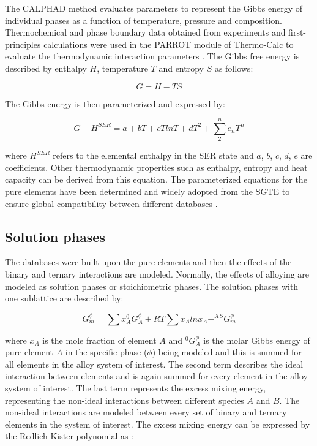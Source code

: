 The CALPHAD method evaluates parameters to represent the Gibbs energy of individual phases as a function of temperature, pressure and composition. Thermochemical and phase boundary data obtained from experiments and first-principles calculations were used in the PARROT module of Thermo-Calc to evaluate the thermodynamic interaction parameters \cite{Andersson2002}. The Gibbs free energy is described by enthalpy $H$, temperature $T$ and entropy $S$ as follows:

\begin{equation}
\label{eq: gibbs}
G = H - T S 
\end{equation}

\noindent The Gibbs energy is then parameterized and expressed by:

\begin{equation}
\label{eq: parameterizaiton}
G - H^{SER} = a + bT + cT ln T + d T^2 + \sum_{2}^{n} e_{n} T^{n}
\end{equation}

\noindent where $H^{SER}$ refers to the elemental enthalpy in the SER state and $a$, $b$, $c$, $d$, $e$ are coefficients. Other thermodynamic properties such as enthalpy, entropy and heat capacity can be derived from this equation. The parameterized equations for the pure elements have been determined and widely adopted from the SGTE to ensure global compatibility between different databases \cite{Dinsdale1991}.

\subsection{Solution phases}

The databases were built upon the pure elements and then the effects of the binary and ternary interactions are modeled. Normally, the effects of alloying are modeled as solution phases or stoichiometric phases. The solution phases with one sublattice are described by: 

\begin{equation}
\label{eq: gibbssolution}
G_m^{\phi} = \sum x_{A} ^{0}G_{A}^{\phi} + R T \sum x_{A} ln x_{A} + ^{XS}G_{m}^{\phi}
\end{equation}

\noindent where $x_{A}$ is the mole fraction of element $A$ and $^{0}G_{A}^{\phi}$ is the molar Gibbs energy of pure element $A$ in the specific phase ($\phi$) being modeled and this is summed for all elements in the alloy system of interest. The second term describes the ideal interaction between elements and is again summed for every element in the alloy system of interest. The last term represents the excess mixing energy, representing the non-ideal interactions between different species $A$ and $B$. The non-ideal interactions are modeled between every set of binary and ternary elements in the system of interest. The excess mixing energy can be expressed by the Redlich-Kister polynomial as \cite{Redlich1948b}: 


